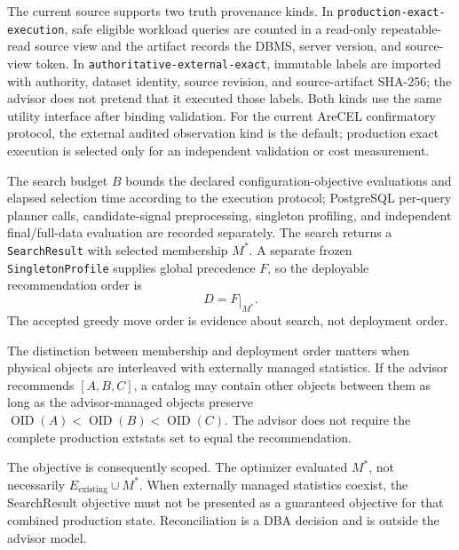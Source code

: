 The current source supports two truth provenance kinds. In
\texttt{production-exact-execution}, safe eligible workload queries are counted
in a read-only repeatable-read source view and the artifact records the DBMS,
server version, and source-view token. In
\texttt{authoritative-external-exact}, immutable labels are imported with
authority, dataset identity, source revision, and source-artifact SHA-256; the
advisor does not pretend that it executed those labels. Both kinds use the
same utility interface after binding validation. For the current AreCEL
confirmatory protocol, the external audited observation kind is the default;
production exact execution is selected only for an independent validation or
cost measurement.

The search budget $B$ bounds the declared configuration-objective evaluations
and elapsed selection time according to the execution protocol; PostgreSQL
per-query planner calls, candidate-signal preprocessing, singleton profiling,
and independent final/full-data evaluation are recorded separately. The
search returns a \texttt{SearchResult} with selected membership $M^*$. A
separate frozen \texttt{SingletonProfile} supplies global precedence $F$, so
the deployable recommendation order is
\[
 D = F\mathbin{|}_{M^*}.
\]
The accepted greedy move order is evidence about search, not deployment order.

The distinction between membership and deployment order matters when physical
objects are interleaved with externally managed statistics. If the advisor
recommends $[A,B,C]$, a catalog may contain other objects between them as long
as the advisor-managed objects preserve
$\operatorname{OID}(A)<\operatorname{OID}(B)<\operatorname{OID}(C)$. The advisor
does not require the complete production extstats set to equal the
recommendation.

The objective is consequently scoped. The optimizer evaluated $M^*$, not
necessarily $E_{\mathrm{existing}}\cup M^*$. When externally managed
statistics coexist, the SearchResult objective must not be presented as a
guaranteed objective for that combined production state. Reconciliation is a
DBA decision and is outside the advisor model.
